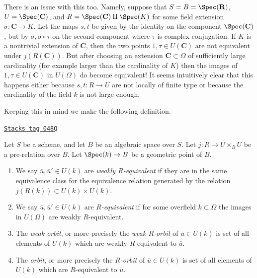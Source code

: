 \medskip\noindent
There is an issue with this too. Namely, suppose that
$S = B = \Spec(\mathbf{R})$,
$U = \Spec(\mathbf{C})$, and
$R = \Spec(\mathbf{C}) \amalg \Spec(K)$
for some field extension $\sigma : \mathbf{C} \to K$.
Let the maps $s, t$ be given by the identity on the component
$\Spec(\mathbf{C})$, but by $\sigma, \sigma \circ \tau$ on the
second component where $\tau$ is complex conjugation. If
$K$ is a nontrivial extension of $\mathbf{C}$, then the two points
$1, \tau \in U(\mathbf{C})$ are not equivalent under
$j(R(\mathbf{C}))$. But after choosing an extension $\mathbf{C} \subset \Omega$
of sufficiently large cardinality (for example larger than the cardinality
of $K$) then the images of $1, \tau \in U(\mathbf{C})$ in
$U(\Omega)$ do become equivalent! It seems intuitively clear that
this happens either because $s, t : R \to U$ are not locally of finite type
or because the cardinality of the field $k$ is not large enough.

\medskip\noindent
Keeping this in mind we make the following definition.

\begin{definition}
\label{groupoids-quotients-definition-geometric-orbits}
\href{https://stacks.math.columbia.edu/tag/048Q}{\texttt{Stacks tag 048Q}}

Let $S$ be a scheme, and let $B$ be an algebraic space over $S$.
Let $j : R \to U \times_B U$ be a pre-relation over $B$.
Let $\Spec(k) \to B$ be a geometric point of $B$.
\begin{enumerate}
\item We say $\overline{u}, \overline{u}' \in U(k)$ are
{\it weakly $R$-equivalent} if they are in the same equivalence class
for the equivalence relation generated by the relation
$j(R(k)) \subset U(k) \times U(k)$.
\item We say $\overline{u}, \overline{u}' \in U(k)$ are
{\it $R$-equivalent} if for some overfield $k \subset \Omega$
the images in $U(\Omega)$ are weakly $R$-equivalent.
\item The {\it weak orbit}, or more precisely the {\it weak $R$-orbit}
of $\overline{u} \in U(k)$ is set of all
elements of $U(k)$ which are weakly $R$-equivalent to $\overline{u}$.
\item The {\it orbit}, or more precisely the {\it $R$-orbit}
of $\overline{u} \in U(k)$ is set of all
elements of $U(k)$ which are $R$-equivalent to $\overline{u}$.
\end{enumerate}
\end{definition}


